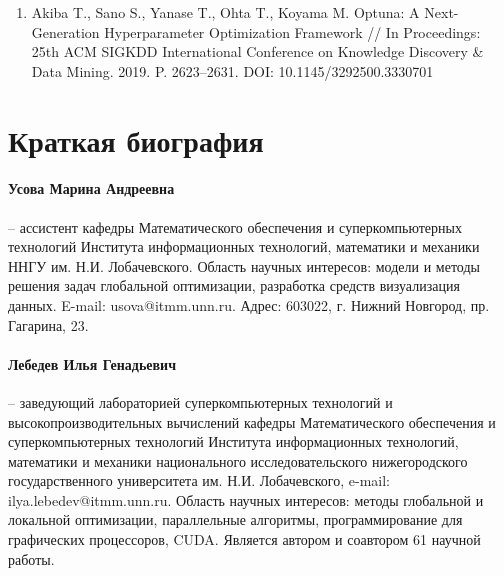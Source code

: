 \documentclass[a4paper,12pt,russian]{article}
\begin{document}
\begin{enumerate}



\item \label{rfa:rulit:optuna}
Akiba T., Sano S., Yanase T., Ohta T., Koyama M. Optuna: A Next-Generation Hyperparameter Optimization Framework // In Proceedings: 25th ACM SIGKDD International Conference on Knowledge Discovery \& Data Mining. 2019. P. 2623--2631. DOI: 10.1145/3292500.3330701


\end{enumerate}


\section*{Краткая биография}
\paragraph{Усова Марина Андреевна} -- ассистент кафедры Математического обеспечения и суперкомпьютерных технологий Института информационных технологий, математики и механики ННГУ им. Н.И. Лобачевского. Область научных интересов: модели и методы решения задач глобальной оптимизации, разработка средств визуализация данных. E-mail: usova@itmm.unn.ru. Адрес: 603022, г. Нижний Новгород, пр. Гагарина, 23.
\paragraph{Лебедев Илья Генадьевич} -- заведующий лабораторией суперкомпьютерных технологий и высокопроизводительных вычислений кафедры Математического обеспечения и суперкомпьютерных технологий Института информационных технологий, математики и механики национального исследовательского нижегородского государственного университета им. Н.И. Лобачевского, e-mail: ilya.lebedev@itmm.unn.ru. Область научных интересов: методы глобальной и локальной оптимизации, параллельные алгоритмы, программирование для графических процессоров, CUDA. Является автором и соавтором 61 научной работы.
\end{document}
